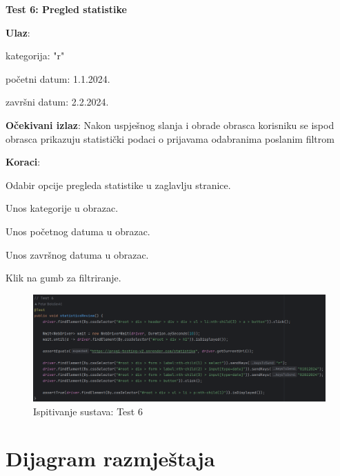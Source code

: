 		 	\textbf{Test 6: Pregled statistike}
		 	
		 	\begin{packed_item} 
		 		\item \textbf{Ulaz}:
		 		\begin{packed_item} 
		 			\item kategorija: "r"
		 			\item početni datum: 1.1.2024.
		 			\item završni datum: 2.2.2024.
		 		\end{packed_item}
		 		\item \textbf{Očekivani izlaz}: Nakon uspješnog slanja i obrade obrasca korisniku se ispod obrasca prikazuju statistički podaci o prijavama odabranima poslanim filtrom
		 		\item \textbf{Koraci}:
		 		\begin{packed_enum} 
		 			\item Odabir opcije pregleda statistike u zaglavlju stranice.
		 			\item Unos kategorije u obrazac.
		 			\item Unos početnog datuma u obrazac.
		 			\item Unos završnog datuma u obrazac.
		 			\item Klik na gumb za filtriranje.
		 		\end{packed_enum}
		 	\end{packed_item}
		 	
		 	\begin{figure}[H]
		 		\includegraphics[width=\textwidth]{slike/SeleniumTest6.png} %
		 		\caption{Ispitivanje sustava: Test 6}
		 		\label{fig:SeleniumTest6} %
		 	\end{figure}
			
			\eject 
		
		
		\section{Dijagram razmještaja}
			
